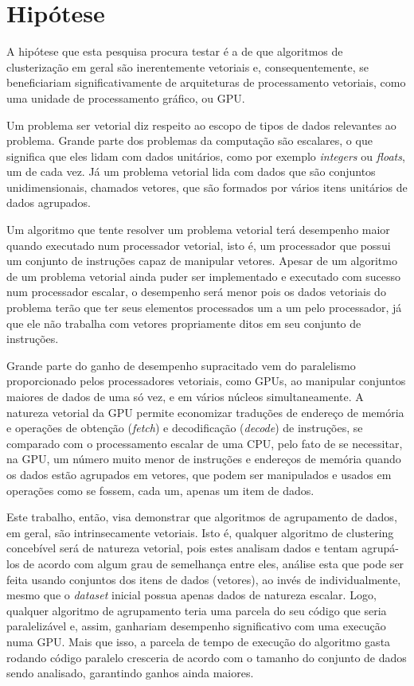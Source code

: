 \documentclass[12pt,
openright, 
oneside, %
a4paper,    %
brazil]{facom-ufu-abntex2}
\begin{document}

\section{Hipótese}

A hipótese que esta pesquisa procura testar é a de que algoritmos de clusterização em geral são inerentemente vetoriais e, consequentemente, se beneficiariam significativamente de arquiteturas de processamento vetoriais, como uma unidade de processamento gráfico, ou GPU.

Um problema ser vetorial diz respeito ao escopo de tipos de dados relevantes ao problema. Grande parte dos problemas da computação são escalares, o que significa que eles lidam com dados unitários, como por exemplo \textit{integers} ou \textit{floats}, um de cada vez. Já um problema vetorial lida com dados que são conjuntos unidimensionais, chamados vetores, que são formados por vários itens unitários de dados agrupados.

Um algoritmo que tente resolver um problema vetorial terá desempenho maior quando executado num processador vetorial, isto é, um processador que possui um conjunto de instruções capaz de manipular vetores. Apesar de um algoritmo de um problema vetorial ainda puder ser implementado e executado com sucesso num processador escalar, o desempenho será menor pois os dados vetoriais do problema terão que ter seus elementos processados um a um pelo processador, já que ele não trabalha com vetores propriamente ditos em seu conjunto de instruções.

Grande parte do ganho de desempenho supracitado vem do paralelismo proporcionado pelos processadores vetoriais, como GPUs, ao manipular conjuntos maiores de dados de uma só vez, e em vários núcleos simultaneamente. A natureza vetorial da GPU permite economizar traduções de endereço de memória e operações de obtenção (\textit{fetch}) e decodificação (\textit{decode}) de instruções, se comparado com o processamento escalar de uma CPU, pelo fato de se necessitar, na GPU, um número muito menor de instruções e endereços de memória quando os dados estão agrupados em vetores, que podem ser manipulados e usados em operações como se fossem, cada um, apenas um item de dados.

Este trabalho, então, visa demonstrar que algoritmos de agrupamento de dados, em geral, são intrinsecamente vetoriais. Isto é, qualquer algoritmo de clustering concebível será de natureza vetorial, pois estes analisam dados e tentam agrupá-los de acordo com algum grau de semelhança entre eles, análise esta que pode ser feita usando conjuntos dos itens de dados (vetores), ao invés de individualmente, mesmo que o \textit{dataset} inicial possua apenas dados de natureza escalar. Logo, qualquer algoritmo de agrupamento teria uma parcela do seu código que seria paralelizável e, assim, ganhariam desempenho significativo com uma execução numa GPU. Mais que isso, a parcela de tempo de execução do algoritmo gasta rodando código paralelo cresceria de acordo com o tamanho do conjunto de dados sendo analisado, garantindo ganhos ainda maiores.
\end{document}
